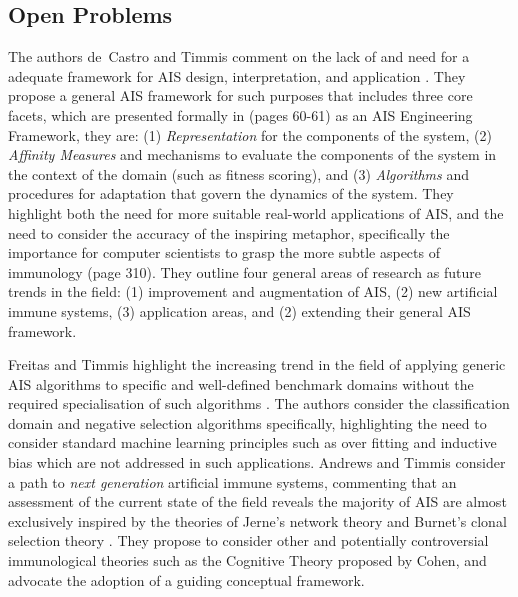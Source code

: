 %
%
\subsection{Open Problems}
\label{subsec:background:problems:review}
The authors de~Castro and Timmis comment on the lack of and need for a adequate framework for AIS design, interpretation, and application \cite{Castro2003}. They propose a general AIS framework for such purposes that includes three core facets, which are presented formally in \cite{Castro2002a} (pages 60-61) as an AIS Engineering Framework, they are: (1) \emph{Representation} for the components of the system, (2) \emph{Affinity Measures} and mechanisms to evaluate the components of the system in the context of the domain (such as fitness scoring), and (3) \emph{Algorithms} and procedures for adaptation that govern the dynamics of the system.
They highlight both the need for more suitable real-world applications of AIS, and the need to consider the accuracy of the inspiring metaphor, specifically the importance for computer scientists to grasp the more subtle aspects of immunology \cite{Castro2002a} (page 310). They outline four general areas of research as future trends in the field: (1) improvement and augmentation of AIS, (2) new artificial immune systems, (3) application areas, and (2) extending their general AIS framework. 

Freitas and Timmis highlight the increasing trend in the field of applying generic AIS algorithms to specific and well-defined benchmark domains without the required specialisation of such algorithms \cite{Freitas2003}. The authors consider the classification domain and negative selection algorithms specifically, highlighting the need to consider standard machine learning principles such as over fitting and inductive bias which are not addressed in such applications.
Andrews and Timmis consider a path to \emph{next generation} artificial immune systems, commenting that an assessment of the current state of the field reveals the majority of AIS are almost exclusively inspired by the theories of Jerne's network theory and Burnet's clonal selection theory \cite{Andrews2005}. They propose to consider other and potentially controversial immunological theories such as the Cognitive Theory proposed by Cohen, and advocate the adoption of a guiding conceptual framework.

